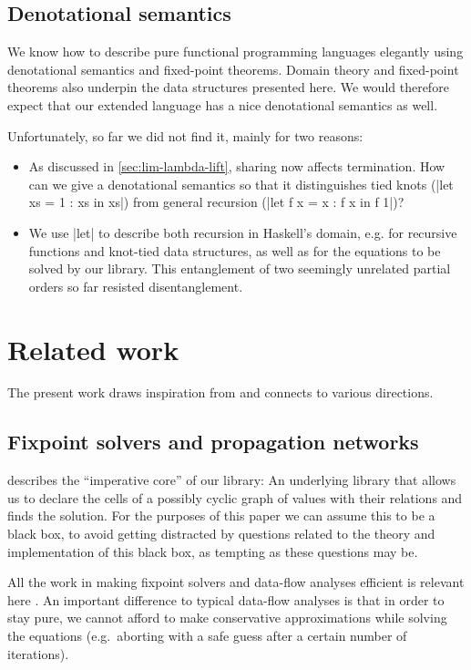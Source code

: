\documentclass[manuscript,screen,acmsmall,nonacm]{acmart}
\begin{document}
\subsection{Denotational semantics}\label{sec:denotational}

We know how to describe pure functional programming languages elegantly using denotational semantics and fixed-point theorems. Domain theory and fixed-point theorems also underpin the data structures presented here. We would therefore expect that our extended language has a nice denotational semantics as well.

Unfortunately, so far we did not find it, mainly for two reasons:
\begin{itemize}
\item As discussed in \cref{sec:lim-lambda-lift}, sharing now affects termination. How can we give a denotational semantics so that it distinguishes tied knots (|let xs = 1 : xs in xs|) from general recursion (|let f x = x : f x in f 1|)?
\item We use |let| to describe both recursion in Haskell's domain, e.g. for recursive functions and knot-tied data structures, as well as for the equations to be solved by our library. This entanglement of two seemingly unrelated partial orders so far resisted disentanglement.
\end{itemize}

\section{Related work}\label{sec:related}

The present work draws inspiration from and connects to various directions.

\subsection{Fixpoint solvers and propagation networks}

 describes the “imperative core” of our library: An underlying library that allows us to declare the cells of a possibly cyclic graph of values with their relations and finds the solution. For the purposes of this paper we can assume this to be a black box, to avoid getting distracted by questions related to the theory and implementation of this black box, as tempting as these questions may be.

All the work in making fixpoint solvers and data-flow analyses efficient is relevant here \citep{kildall-73,kam-ullman-76}. An important difference to typical data-flow analyses is that in order to stay pure, we cannot afford to make conservative approximations while solving the equations (e.g.\ aborting with a safe guess after a certain number of iterations).
\end{document}
